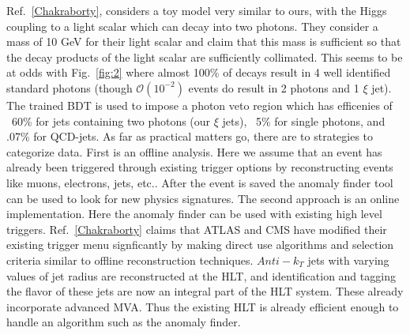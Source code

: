 \documentclass[aps,onecolumn,twoside,secnumarabic,balancelastpage,amsmath,amssymb,nofootinbib,hyperref=pdftex]{revtex4}
\begin{document}
\vskip 0.12in
Ref.~\ref{Chakraborty}, considers a toy model very similar to ours, with the Higgs coupling to a light scalar which can decay into two photons. They consider a mass of 10 GeV for their light scalar and claim that this mass is sufficient so that the decay products of the light scalar are sufficiently collimated. This seems to be at odds with Fig.~\ref{fig:2} where almost 100\% of decays result in 4 well identified standard photons (though $\mathcal{O}(10^{-2})$ events do result in 2 photons and 1 $\xi$ jet). The trained BDT is used to impose a photon veto region which has efficenies of ~60\% for jets containing two photons (our $\xi$ jets), ~5\% for single photons, and .07\% for QCD-jets. 
\vskip 0.12in
As far as practical matters go, there are to strategies to categorize data. First is an offline analysis. Here we assume that an event has already been triggered through existing trigger options by reconstructing events like muons, electrons, jets, etc.. After the event is saved the anomaly finder tool can be used to look for new physics signatures. The second approach is an online implementation. Here the anomaly finder can be used with existing high level triggers. Ref.~\ref{Chakraborty} claims that ATLAS and CMS have modified their existing trigger menu signficantly by making direct use algorithms and selection criteria similar to offline reconstruction techniques. $Anti-k_{T}$ jets with varying values of jet radius are reconstructed at the HLT,  and identification and tagging the flavor of these jets are now an integral part of the HLT system. These already incorporate advanced MVA. Thus the existing HLT is already efficient enough to handle an algorithm such as the anomaly finder.
\end{document}
